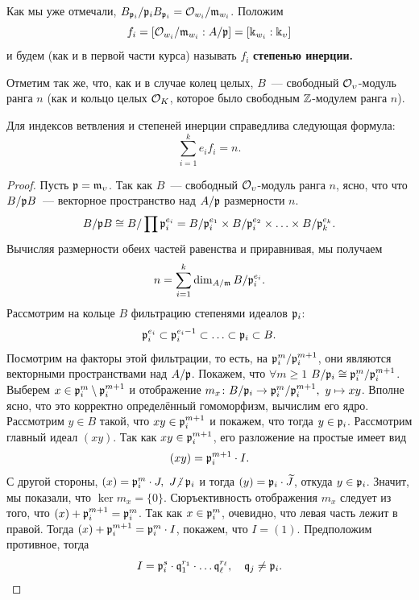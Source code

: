 	Как мы уже отмечали, $B_{\mathfrak{p}_i} /\mathfrak{p}_i B_{\mathfrak{p}_i} = \mathcal{O}_{w_i}/\mathfrak{m}_{w_i}$. Положим 
	\[
		f_i = [\mathcal{O}_{w_i}/\mathfrak{m}_{w_i} : A/\mathfrak{p}] = [\Bbbk_{w_i} : \Bbbk_{\upsilon}] 
	\]
	и будем (как и в первой части курса) называть $f_i$ \bf{степенью инерции}.

	Отметим так же, что, как и в случае колец целых, $B$~--- свободный $\mathcal{O}_{\upsilon}$-модуль ранга $n$ (как и кольцо целых $\mathcal{O}_{K}$, которое было свободным $\mathbb{Z}$-модулем ранга $n$).


	\begin{theorem} 
		Для индексов ветвления и степеней инерции справедлива следующая формула: 
		\[
			\sum_{i = 1}^{k} e_i f_i = n.
		\]
	\end{theorem}
	\begin{proof}
		Пусть $\mathfrak{p} = \mathfrak{m}_{\upsilon}$. Так как $B$~--- свободный $\mathcal{O}_{\upsilon}$-модуль ранга $n$, ясно, что что $B/\mathfrak{p} B$~--- векторное пространство над $A/\mathfrak{p}$ размерности $n$. 
		\[
			B/\mathfrak{p} B \cong B/\prod \mathfrak{p}_i^{e_i} = B/\mathfrak{p}_{i}^{e_1} \times  B/\mathfrak{p}_{i}^{e_2} \times \ldots \times  B/\mathfrak{p}_{k}^{e_k}.
		\]
		Вычисляя размерности обеих частей равенства и приравнивая, мы получаем 
		\[
			n = \sum_{i = 1}^{k} \dim_{A/\mathfrak{m}} B/\mathfrak{p}_i^{e_i}.
		\]
		Рассмотрим на кольце $B$ фильтрацию степенями идеалов $\mathfrak{p}_i$:
		\[
			\mathfrak{p}_{i}^{e_i} \subset \mathfrak{p}_i^{e_i - 1} \subset \ldots \subset \mathfrak{p}_i \subset B.
		\]
		Посмотрим на факторы этой фильтрации, то есть, на  $\mathfrak{p}_{i}^{m}/\mathfrak{p}_{i}^{m + 1}$, они являются векторными пространствами над $A/\mathfrak{p}$. Покажем, что $\forall m \ge 1$ $B/\mathfrak{p}_i \cong \mathfrak{p}_i^m / \mathfrak{p}_i^{m + 1}$. Выберем $x \in \mathfrak{p}_i^{m}\setminus \mathfrak{p}_{i}^{m + 1}$ и отображение $m_{x}\colon B/\mathfrak{p}_i \to \mathfrak{p}_i^m/\mathfrak{p}_i^{m + 1}, \ y \mapsto xy$. Вполне ясно, что это корректно определённый гомоморфизм, вычислим его ядро.  Рассмотрим $y \in B$ такой, что $xy \in \mathfrak{p}_i^{m + 1}$ и покажем, что тогда $y \in \mathfrak{p}_i$. Рассмотрим главный идеал $(xy)$. Так как $xy \in \mathfrak{p}_i^{m + 1}$, его разложение на простые имеет вид 
		\[
			(xy) = \mathfrak{p}_i^{m + 1} \cdot I.
		\]
		С другой стороны, $(x) = \fp_i^{m} \cdot J, \ J \notdivby \fp_i$ и тогда  $(y) = \mathfrak{p}_i \cdot \widetilde{J}$, откуда $y \in \mathfrak{p}_i$. Значит, мы показали, что $\ker{m_{x}} = \{ 0\}$. Сюръективность отображения $m_{x}$ следует из того, что $(x) + \mathfrak{p}_{i}^{m + 1} = \mathfrak{p}_{i}^m$. Так как $x \in \mathfrak{p}_i^m$, очевидно, что левая часть лежит в правой. Тогда $(x) + \mathfrak{p}_{i}^{m + 1} =  \mathfrak{p}_i^m \cdot I$, покажем, что $I = (1)$. Предположим противное, тогда 
		\[
			I = \mathfrak{p}_i^{s} \cdot \mathfrak{q}_{1}^{r_1} \cdot \ldots \mathfrak{q}_{\ell}^{r_{\ell}}, \quad \mathfrak{q}_j \neq \mathfrak{p}_i.
		\]


\end{proof}
